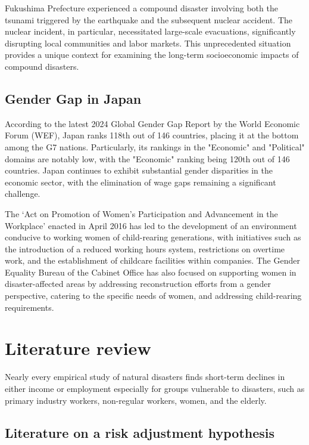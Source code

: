 \documentclass[12pt,halfline,a4paper]{ouparticle}
\begin{document}
Fukushima Prefecture experienced a compound disaster involving both the tsunami triggered by the earthquake and the subsequent nuclear accident. The nuclear incident, in particular, necessitated large-scale evacuations, significantly disrupting local communities and labor markets. This unprecedented situation provides a unique context for examining the long-term socioeconomic impacts of compound disasters.

\subsection{Gender Gap in Japan}
\label{sec5.1}

According to the latest 2024 Global Gender Gap Report by the World Economic Forum (WEF), Japan ranks 118th out of 146 countries, placing it at the bottom among the G7 nations. Particularly, its rankings in the "Economic" and "Political" domains are notably low, with the "Economic" ranking being 120th out of 146 countries. Japan continues to exhibit substantial gender disparities in the economic sector, with the elimination of wage gaps remaining a significant challenge.

The ‘Act on Promotion of Women’s Participation and Advancement in the Workplace’ enacted in April 2016 has led to the development of an environment conducive to working women of child-rearing generations, with initiatives such as the introduction of a reduced working hours system, restrictions on overtime work, and the establishment of childcare facilities within companies. The Gender Equality Bureau of the Cabinet Office has also focused on supporting women in disaster-affected areas by addressing reconstruction efforts from a gender perspective, catering to the specific needs of women, and addressing child-rearing requirements.


\section{Literature review}
\label{sec3}

Nearly every empirical study of natural disasters finds short-term declines in either income or employment especially for groups vulnerable to disasters, such as primary industry workers, non-regular workers, women, and the elderly. 

\subsection{Literature on a risk adjustment hypothesis}
\label{sec5.1}
\end{document}
